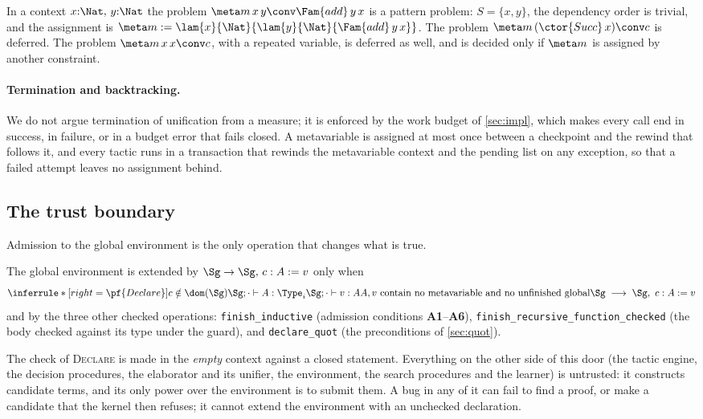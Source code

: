 \begin{example}
In a context $x{:}\Nat,\,y{:}\Nat$ the problem $\meta m\,x\,y \conv \Fam{add}\,y\,x$ is a pattern problem: $S=\{x,y\}$, the dependency order is trivial, and the assignment is $\meta m := \lam{x}{\Nat}{\lam{y}{\Nat}{\Fam{add}\,y\,x}}$.
The problem $\meta m\,(\ctor{Succ}\,x)\conv c$ is deferred.
The problem $\meta m\,x\,x \conv c$, with a repeated variable, is deferred as well, and is decided only if $\meta m$ is assigned by another constraint.
\end{example}

\paragraph{Termination and backtracking.}
We do not argue termination of unification from a measure; it is enforced by the work budget of \cref{sec:impl}, which makes every call end in success, in failure, or in a budget error that fails closed.
A metavariable is assigned at most once between a checkpoint and the rewind that follows it, and every tactic runs in a transaction that rewinds the metavariable context and the pending list on any exception, so that a failed attempt leaves no assignment behind.

\subsection{The trust boundary}\label{sec:trust}

Admission to the global environment is the only operation that changes what is true.
\begin{definition}\label{def:entry}
The global environment is extended by $\Sg \to \Sg,\,c : A \mathrel{:=} v$ only when
\[
\inferrule*[right=\pf{Declare}]{c\notin\dom(\Sg) \\ \Sg;\cdot\vdash A : \Type_i \\ \Sg;\cdot\vdash v : A \\ A, v \text{ contain no metavariable and no unfinished global}}
{\Sg \;\longrightarrow\; \Sg,\ c : A \mathrel{:=} v}
\]
and by the three other checked operations: \texttt{finish\_inductive} (admission conditions \textbf{A1}--\textbf{A6}), \texttt{finish\_recursive\_function\_checked} (the body checked against its type under the guard), and \texttt{declare\_quot} (the preconditions of \cref{sec:quot}).
\end{definition}
The check of \textsc{Declare} is made in the \emph{empty} context against a closed statement.
Everything on the other side of this door (the tactic engine, the decision procedures, the elaborator and its unifier, the environment, the search procedures and the learner) is untrusted: it constructs candidate terms, and its only power over the environment is to submit them.
A bug in any of it can fail to find a proof, or make a candidate that the kernel then refuses; it cannot extend the environment with an unchecked declaration.

